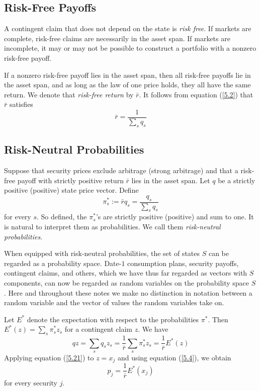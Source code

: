 \documentclass[\topdir/lecture\_notes.tex]{subfiles}
\begin{document}
\subsection{Risk-Free Payoffs}
A contingent claim that does not depend on the state is \emph{risk free}. If markets are complete, risk-free claims are necessarily in the asset span. If markets are incomplete, it may or may not be possible to construct a portfolio with a nonzero risk-free payoff.

If a nonzero risk-free payoff lies in the asset span, then all risk-free payoffs lie in the asset span, and as long as the law of one price holds, they all have the same return. We denote that \emph{risk-free return} by \(\bar{r}\). It follows from equation (\ref{5.2}) that \(\bar{r}\) satisfies
\begin{equation*}
\bar{r}=\frac{1}{\sum_{s} q_{s}} \label{eq:risk_free_return} 
\end{equation*}

\subsection{Risk-Neutral Probabilities}
Suppose that security prices exclude arbitrage (strong arbitrage) and that a risk-free payoff with strictly positive return \(\bar{r}\) lies in the asset span. Let \(q\) be a strictly positive (positive) state price vector. Define
\begin{equation*}
\pi_{s}^{*} := \bar{r} q_{s}=\frac{q_{s}}{\sum_{s} q_{s}} \label{eq:risk_neutral_probabilities} 
\end{equation*}
for every \(s\). So defined, the \(\pi_{s}^{*}\)'s are strictly positive (positive) and sum to one. It is natural to interpret them as probabilities. We call them \emph{risk-neutral probabilities}.

When equipped with risk-neutral probabilities, the set of states \(S\) can be regarded as a probability space. Date-\(1\) consumption plans, security payoffs, contingent claims, and others, which we have thus far regarded as vectors with \(S\) components, can now be regarded as random variables on the probability space \(S\). Here and throughout these notes we make no distinction in notation between a random variable and the vector of values the random variables take on.

Let \(E^{*}\) denote the expectation with respect to the probabilities \(\pi^{*}\). Then \(E^{*}(z)=\sum_{s} \pi_{s}^{*} z_{s}\) for a contingent claim \(z\). We have
\begin{equation}
q z=\sum_{s} q_{s} z_{s}=\frac{1}{\bar{r}} \sum_{s} \pi_{s}^{*} z_{s}=\frac{1}{\bar{r}} E^{*}(z) \label{5.21}
\end{equation}
Applying equation (\ref{5.21}) to \(z=x_{j}\) and using equation (\ref{5.4}), we obtain
\begin{equation}
p_{j}=\frac{1}{\bar{r}} E^{*}\left(x_{j}\right) \label{5.22}
\end{equation}
for every security \(j\).
\end{document}
